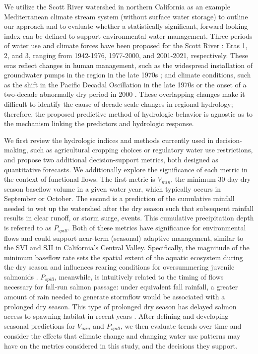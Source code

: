 \documentclass[hess, manuscript]{copernicus}
\begin{document}
We utilize the Scott River watershed in northern California as an
example Mediterranean climate stream system (without surface water
storage) to outline our approach and to evaluate whether a statistically
significant, forward looking index can be defined to support
environmental water management. Three periods of water use and climate
forces have been proposed for the Scott River \citep[e.g.,
by][]{Pyschik2022}: Eras 1, 2, and 3, ranging from 1942-1976, 1977-2000,
and 2001-2021, respectively. These eras reflect changes in human
management, such as the widespread installation of groundwater pumps in
the region in the late 1970s \citep{Tolley2019}; and climate conditions,
such as the shift in the Pacific Decadal Oscillation in the late 1970s
\citep{Francis1998} or the onset of a two-decade abnormally dry period
in 2000 \citep{Williams2020}. These overlapping changes make it
difficult to identify the cause of decade-scale changes in regional
hydrology; therefore, the proposed predictive method of hydrologic
behavior is agnostic as to the mechanism linking the predictors and
hydrologic response.

We first review the hydrologic indices and methods currently used in
decision-making, such as agricultural cropping choices or regulatory
water use restrictions, and propose two additional decision-support
metrics, both designed as quantitative forecasts. We additionally
explore the significance of each metric in the context of functional
flows. The first metric is \(V_{min}\), the minimum 30-day dry season
baseflow volume in a given water year, which typically occurs in
September or October. The second is a prediction of the cumulative
rainfall needed to wet up the watershed after the dry season such that
subsequent rainfall results in clear runoff, or storm surge, events.
This cumulative precipitation depth is referred to as \(P_{spill}\).
Both of these metrics have significance for environmental flows and
could support near-term (seasonal) adaptive management, similar to the
SVI and SJI in California's Central Valley. Specifically, the magnitude
of the minimum baseflow rate sets the spatial extent of the aquatic
ecosystem during the dry season and influences rearing conditions for
oversummering juvenile salmonids \citep{Gorman2016}. \(P_{spill}\),
meanwhile, is intuitively related to the timing of flows necessary for
fall-run salmon passage: under equivalent fall rainfall, a greater
amount of rain needed to generate stormflow would be associated with a
prolonged dry season. This type of prolonged dry season has delayed
salmon access to spawning habitat in recent years
\citeyearpar[CDFW][]{CDFW2015a}. After defining and developing seasonal
predictions for \(V_{min}\) and \(P_{spill}\), we then evaluate trends
over time and consider the effects that climate change and changing
water use patterns may have on the metrics considered in this study, and
the decisions they support.
\end{document}

